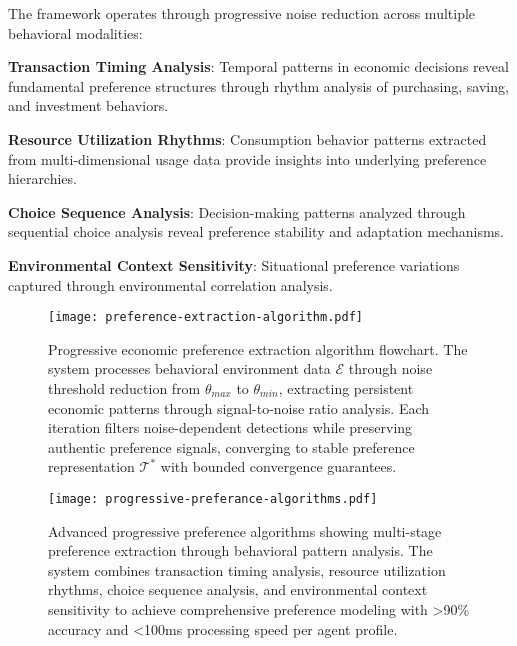 \documentclass[12pt,a4paper]{article}
\begin{document}
The framework operates through progressive noise reduction across multiple behavioral modalities:

\textbf{Transaction Timing Analysis}: Temporal patterns in economic decisions reveal fundamental preference structures through rhythm analysis of purchasing, saving, and investment behaviors.

\textbf{Resource Utilization Rhythms}: Consumption behavior patterns extracted from multi-dimensional usage data provide insights into underlying preference hierarchies.

\textbf{Choice Sequence Analysis}: Decision-making patterns analyzed through sequential choice analysis reveal preference stability and adaptation mechanisms.

\textbf{Environmental Context Sensitivity}: Situational preference variations captured through environmental correlation analysis.

\begin{figure}[t]
\centering
\texttt{[image: preference-extraction-algorithm.pdf]}
\caption{Progressive economic preference extraction algorithm flowchart. The system processes behavioral environment data $\mathcal{E}$ through noise threshold reduction from $\theta_{max}$ to $\theta_{min}$, extracting persistent economic patterns through signal-to-noise ratio analysis. Each iteration filters noise-dependent detections while preserving authentic preference signals, converging to stable preference representation $\mathcal{T}^*$ with bounded convergence guarantees.}
\label{fig:preference-extraction-algorithm}
\end{figure}

\begin{figure}[H]
\centering
\texttt{[image: progressive-preferance-algorithms.pdf]}
\caption{Advanced progressive preference algorithms showing multi-stage preference extraction through behavioral pattern analysis. The system combines transaction timing analysis, resource utilization rhythms, choice sequence analysis, and environmental context sensitivity to achieve comprehensive preference modeling with >90\% accuracy and <100ms processing speed per agent profile.}
\label{fig:progressive-preference-algorithms}
\end{figure}
\end{document}

